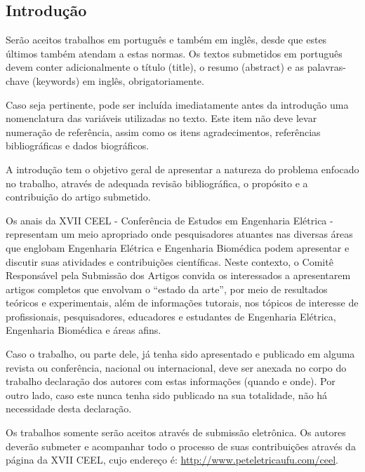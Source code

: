 \documentclass{ceel}
\begin{document}
\begin{multicols}{2}
\section{Introdução}
Serão aceitos trabalhos em português e também em inglês, desde que estes últimos também atendam a estas normas. Os textos submetidos em português devem conter adicionalmente o título (title), o resumo (abstract) e as palavras-chave (keywords) em inglês, obrigatoriamente.

Caso seja pertinente, pode ser incluída imediatamente antes da introdução uma nomenclatura das variáveis utilizadas no texto. Este item não deve levar numeração de referência, assim como os itens agradecimentos, referências bibliográficas e dados biográficos.

A introdução tem o objetivo geral de apresentar a natureza do problema enfocado no trabalho, através de adequada revisão bibliográfica, o propósito e a contribuição do artigo submetido.

Os anais da XVII CEEL - Conferência de Estudos em Engenharia Elétrica - representam um meio apropriado onde pesquisadores atuantes nas diversas áreas que englobam Engenharia Elétrica e Engenharia Biomédica podem apresentar e discutir suas atividades e contribuições científicas. Neste contexto, o Comitê Responsável pela Submissão dos Artigos convida os interessados a apresentarem artigos completos que envolvam o “estado da arte”, por meio de resultados teóricos e experimentais, além de informações tutorais, nos tópicos de interesse de profissionais, pesquisadores, educadores e estudantes de Engenharia Elétrica, Engenharia Biomédica e áreas afins. 

Caso o trabalho, ou parte dele, já tenha sido apresentado e publicado em alguma revista ou conferência, nacional ou internacional, deve ser anexada no corpo do trabalho declaração dos autores com estas informações (quando e onde). Por outro lado, caso este nunca tenha sido publicado na sua totalidade, não há necessidade desta declaração.

Os trabalhos somente serão aceitos através de submissão eletrônica. Os autores deverão submeter e acompanhar todo o processo de suas contribuições através da página da XVII CEEL, cujo endereço é: \url{http://www.peteletricaufu.com/ceel}.


\end{multicols}
\end{document}

